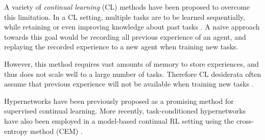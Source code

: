 \documentclass[dvipsnames]{article} %
\newcommand{\comment}[1]{}
\newcommand{\sa}[1] {\comment{{\color{cyan} SA: #1}}}                %
\newcommand{\jh}[1] {\comment{{\color{RawSienna} JH: #1}}}           %
\begin{document}
A variety of \textit{continual learning} (CL) methods have been proposed to overcome this limitation. In a CL setting, multiple tasks are to be learned sequentially, while retaining or even improving knowledge about past tasks \citep{towardsCRL}. A naive approach towards this goal would be recording all previous experience of an agent, and replaying the recorded experience to a new agent when training new tasks. 
\sa{For RL there is no training data as in supervised learning. What can be stored are the (S,A,R,S') tuples in a replay buffer which can then be utilized by an offline RL algorithm. Is this what you wanted to imply?}
However, this method requires vast amounts of memory to store experiences, and thus does not scale well to a large number of tasks. Therefore CL desiderata often assume that previous experience will not be available when training new tasks \citep{lwf}. 

\sa{This (or the end of this paragraph) is a good place to mention that previous work has used HN for model based RL, and we show that HN is a good candidate for continual RL for a state-of-the-art model-free algorithm as well. You should also mention the other differences with the MBRL paper (e.g. more types of doors, reporting of the door opening rate, etc.}
Hypernetworks have been previously proposed as a promising method \citep{CLHypernetworks} for supervised continual learning. More recently, task-conditioned hypernetworks have also been employed in a model-based continual RL setting using the cross-entropy method (CEM) \citep{MBRLHypernetworks}. 


\end{document}

